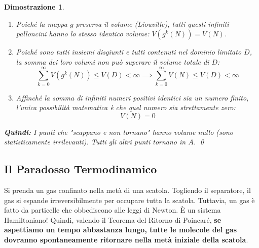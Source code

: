 \documentclass[openany]{book}
\newtheorem*{dimostrazione}{Dimostrazione}
\theoremstyle{definition}
\theoremstyle{remark}
\begin{document}
\begin{dimostrazione}
\begin{enumerate}
\begin{center}
    \end{center}
    
    \item Poiché la mappa $g$ preserva il volume (Liouville), tutti questi infiniti palloncini hanno lo stesso identico volume: $V(g^k(N)) = V(N)$.
    
    \item Poiché sono tutti insiemi disgiunti e tutti contenuti nel dominio limitato $D$, la somma dei loro volumi non può superare il volume totale di $D$:
    \begin{equation*}
        \sum_{k=0}^{\infty} V(g^k(N)) \le V(D) < \infty \implies \sum_{k=0}^{\infty} V(N) \le V(D) < \infty
    \end{equation*}
    
    \item Affinché la somma di infiniti numeri positivi identici sia un numero finito, l'unica possibilità matematica è che quel numero sia strettamente zero:
    \begin{equation*}
        V(N) = 0
    \end{equation*}
\end{enumerate}
\textbf{Quindi:} I punti che "scappano e non tornano" hanno volume nullo (sono statisticamente irrilevanti). Tutti gli altri punti tornano in $A$. \qed
\end{dimostrazione}

\subsection*{Il Paradosso Termodinamico}
Si prenda un gas confinato nella metà di una scatola. Togliendo il separatore, il gas si espande irreversibilmente per occupare tutta la scatola.
Tuttavia, un gas è fatto da particelle che obbediscono alle leggi di Newton. È un sistema Hamiltoniano! Quindi, valendo il Teorema del Ritorno di Poincaré, \textbf{se aspettiamo un tempo abbastanza lungo, tutte le molecole del gas dovranno spontaneamente ritornare nella metà iniziale della scatola}.
\end{document}
